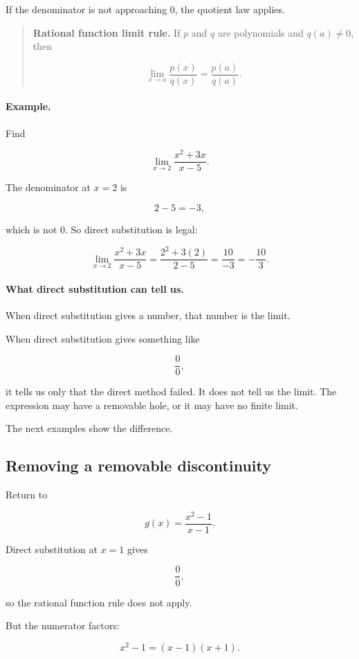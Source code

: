 If the denominator is not approaching \(0\), the quotient law applies.

\begin{quote}
\textbf{Rational function limit rule.}
If \(p\) and \(q\) are polynomials and \(q(a)\neq0\), then

\[
\lim_{x\to a}\frac{p(x)}{q(x)}
=
\frac{p(a)}{q(a)}.
\]
\end{quote}

\paragraph{Example.}
Find

\[
\lim_{x\to2}\frac{x^2+3x}{x-5}.
\]

The denominator at \(x=2\) is

\[
2-5=-3,
\]

which is not \(0\).  So direct substitution is legal:

\[
\lim_{x\to2}\frac{x^2+3x}{x-5}
=
\frac{2^2+3(2)}{2-5}
=
\frac{10}{-3}
=
-\frac{10}{3}.
\]

\paragraph{What direct substitution can tell us.}
When direct substitution gives a number, that number is the limit.

When direct substitution gives something like

\[
\frac{0}{0},
\]

it tells us only that the direct method failed.  It does not tell us the limit.  The expression may have a removable hole, or it may have no finite limit.

The next examples show the difference.

\subsection{Removing a removable discontinuity}
\label{subsec:removing-removable-discontinuity}

Return to

\[
g(x)=\frac{x^2-1}{x-1}.
\]

Direct substitution at \(x=1\) gives

\[
\frac{0}{0},
\]

so the rational function rule does not apply.

But the numerator factors:

\[
x^2-1=(x-1)(x+1).
\]

